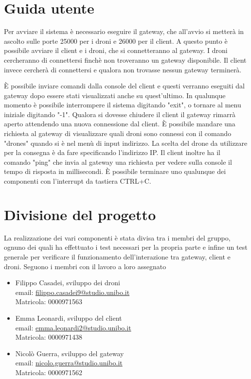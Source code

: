 \documentclass[a4paper,12pt]{report}
\begin{document}
\appendix
\chapter{Guida utente}

Per avviare il sistema è necessario eseguire il gateway, che all'avvio si metterà in ascolto sulle porte 25000 per i droni e 26000 per il client.
A questo punto è possibile avviare il client e i droni, che si connetteranno al gateway. I droni cercheranno di connettersi finchè non troveranno un gateway
disponibile. Il client invece cercherà di connettersi e qualora non trovasse nessun gateway terminerà.

È possibile inviare comandi dalla console del client e questi verranno eseguiti dal gateway dopo essere stati visualizzati anche su quest'ultimo. In qualunque momento è possibile
interrompere il sistema digitando "exit", o tornare al menu iniziale digitando "-1".
Qualora si dovesse chiudere il client il gateway rimarrà aperto attendendo una nuova connessione dal client.
È possibile mandare una richiesta al gateway di visualizzare quali droni sono connessi con il comando "drones" quando si è nel menù di input indirizzo. La scelta del drone da 
utilizzare per la consegna è da fare specificando l'indirizzo IP. Il client inoltre ha il comando "ping" che invia al gateway una richiesta per vedere sulla console il tempo di risposta in millisecondi.
È possibile terminare uno qualunque dei componenti con l'interrupt da tastiera CTRL+C.

\chapter{Divisione del progetto}
La realizzazione dei vari componenti è stata divisa tra i membri del gruppo, ognuno dei quali ha effettuato i test necessari per la propria parte e infine un test generale per
verificare il funzionamento dell'interazione tra gateway, client e droni.
Seguono i membri con il lavoro a loro assegnato
\begin{itemize}
    \item Filippo Casadei, sviluppo dei droni\\ email: \url{filippo.casadei9@studio.unibo.it}\\ Matricola: 0000971563
    \item Emma Leonardi, sviluppo del client\\ email: \url{emma.leonardi2@studio.unibo.it}\\ Matricola: 0000971438
    \item Nicolò Guerra, sviluppo del gateway\\ email: \url{nicolo.guerra@studio.unibo.it} \\ Matricola: 0000971562
\end{itemize}
\end{document}
